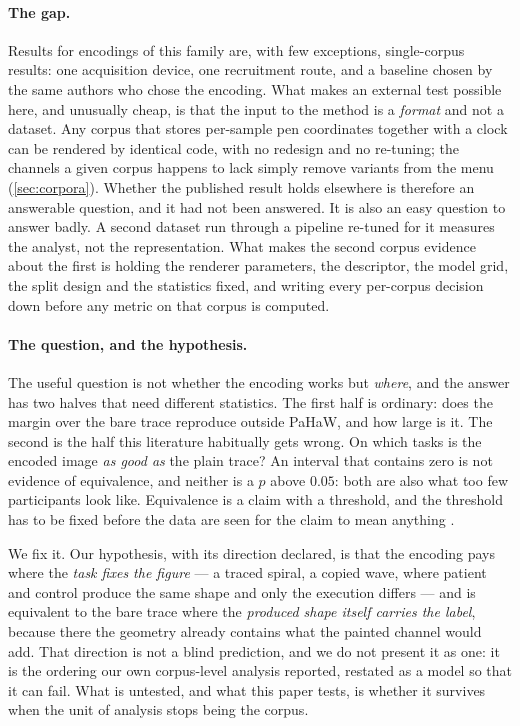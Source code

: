 \paragraph{The gap.} Results for encodings of this family are, with few exceptions, single-corpus
results: one acquisition device, one recruitment route, and a baseline chosen by the same authors
who chose the encoding. What makes an external test possible here, and unusually cheap, is that
the input to the method is a \emph{format} and not a dataset. Any corpus that stores per-sample pen
coordinates together with a clock can be rendered by identical code, with no redesign and no
re-tuning; the channels a given corpus happens to lack simply remove variants from the menu
(\cref{sec:corpora}). Whether the published result holds elsewhere is therefore an answerable
question, and it had not been answered. It is also an easy question to answer badly. A second
dataset run through a pipeline re-tuned for it measures the analyst, not the representation. What
makes the second corpus evidence about the first is holding the renderer parameters, the
descriptor, the model grid, the split design and the statistics fixed, and writing every
per-corpus decision down before any metric on that corpus is computed.

\paragraph{The question, and the hypothesis.} The useful question is not whether the encoding works
but \emph{where}, and the answer has two halves that need different statistics. The first half is
ordinary: does the margin over the bare trace reproduce outside PaHaW, and how large is it. The
second is the half this literature habitually gets wrong. On which tasks is the encoded image
\emph{as good as} the plain trace? An interval that contains zero is not evidence of equivalence,
and neither is a $p$ above $0.05$: both are also what too few participants look like. Equivalence
is a claim with a threshold, and the threshold has to be fixed before the data are seen for the
claim to mean anything \citep{schuirmann1987,lakens2018equivalence}.

We fix it. Our hypothesis, with its direction declared, is that the encoding pays where the
\emph{task fixes the figure} --- a traced spiral, a copied wave, where patient and control produce
the same shape and only the execution differs --- and is equivalent to the bare trace where the
\emph{produced shape itself carries the label}, because there the geometry already contains what
the painted channel would add. That direction is not a blind prediction, and we do not present it
as one: it is the ordering our own corpus-level analysis reported, restated as a model so that it
can fail. What is untested, and what this paper tests, is whether it survives when the unit of
analysis stops being the corpus.

